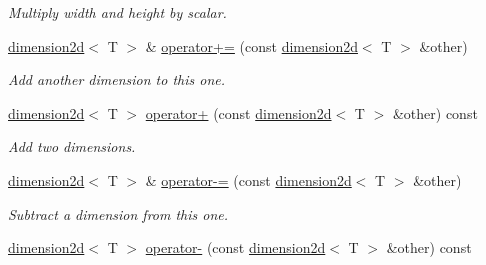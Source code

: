 \begin{DoxyCompactItemize}
\begin{DoxyCompactList}\small\item\em Multiply width and height by scalar. \end{DoxyCompactList}\item 
\hyperlink{classirr_1_1core_1_1dimension2d}{dimension2d}$<$ T $>$ \& \hyperlink{classirr_1_1core_1_1dimension2d_ae233386e59e95f213367922f7638bc46}{operator+=} (const \hyperlink{classirr_1_1core_1_1dimension2d}{dimension2d}$<$ T $>$ \&other)\hypertarget{classirr_1_1core_1_1dimension2d_ae233386e59e95f213367922f7638bc46}{}\label{classirr_1_1core_1_1dimension2d_ae233386e59e95f213367922f7638bc46}

\begin{DoxyCompactList}\small\item\em Add another dimension to this one. \end{DoxyCompactList}\item 
\hyperlink{classirr_1_1core_1_1dimension2d}{dimension2d}$<$ T $>$ \hyperlink{classirr_1_1core_1_1dimension2d_a6f3010fe9e2e9acbf56a1ec15a142765}{operator+} (const \hyperlink{classirr_1_1core_1_1dimension2d}{dimension2d}$<$ T $>$ \&other) const \hypertarget{classirr_1_1core_1_1dimension2d_a6f3010fe9e2e9acbf56a1ec15a142765}{}\label{classirr_1_1core_1_1dimension2d_a6f3010fe9e2e9acbf56a1ec15a142765}

\begin{DoxyCompactList}\small\item\em Add two dimensions. \end{DoxyCompactList}\item 
\hyperlink{classirr_1_1core_1_1dimension2d}{dimension2d}$<$ T $>$ \& \hyperlink{classirr_1_1core_1_1dimension2d_af5bb67163a3cdbcbceb9eda015382bfe}{operator-\/=} (const \hyperlink{classirr_1_1core_1_1dimension2d}{dimension2d}$<$ T $>$ \&other)\hypertarget{classirr_1_1core_1_1dimension2d_af5bb67163a3cdbcbceb9eda015382bfe}{}\label{classirr_1_1core_1_1dimension2d_af5bb67163a3cdbcbceb9eda015382bfe}

\begin{DoxyCompactList}\small\item\em Subtract a dimension from this one. \end{DoxyCompactList}\item 
\hyperlink{classirr_1_1core_1_1dimension2d}{dimension2d}$<$ T $>$ \hyperlink{classirr_1_1core_1_1dimension2d_a323cdb56e179c78f37f5016e49587d2c}{operator-\/} (const \hyperlink{classirr_1_1core_1_1dimension2d}{dimension2d}$<$ T $>$ \&other) const \hypertarget{classirr_1_1core_1_1dimension2d_a323cdb56e179c78f37f5016e49587d2c}{}\label{classirr_1_1core_1_1dimension2d_a323cdb56e179c78f37f5016e49587d2c}


\end{DoxyCompactItemize}
